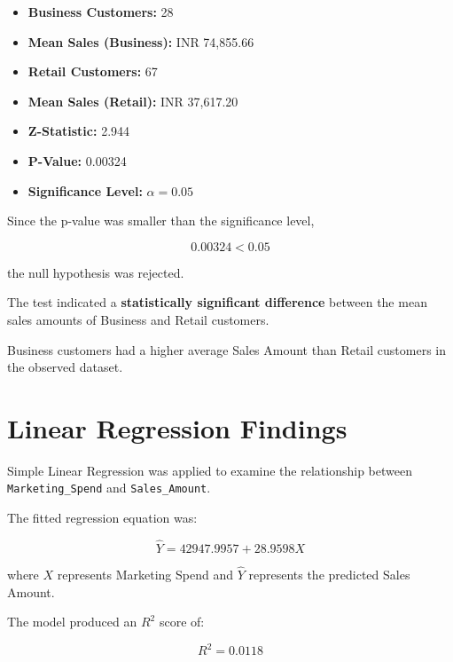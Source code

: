 \documentclass[12pt,a4paper]{report}
\begin{document}
\begin{itemize}

    \item \textbf{Business Customers:} 28

    \item \textbf{Mean Sales (Business):}
    INR 74,855.66

    \item \textbf{Retail Customers:} 67

    \item \textbf{Mean Sales (Retail):}
    INR 37,617.20

    \item \textbf{Z-Statistic:} 2.944

    \item \textbf{P-Value:} 0.00324

    \item \textbf{Significance Level:}
    $\alpha = 0.05$

\end{itemize}

Since the p-value was smaller
than the significance level,

\[
0.00324 < 0.05
\]

the null hypothesis was rejected.

The test indicated a
\textbf{statistically significant
difference} between the mean
sales amounts of Business
and Retail customers.

Business customers had a
higher average Sales Amount
than Retail customers
in the observed dataset.


\section{Linear Regression Findings}

Simple Linear Regression was
applied to examine the
relationship between
\texttt{Marketing\_Spend}
and \texttt{Sales\_Amount}.

The fitted regression equation was:

\[
\hat{Y} = 42947.9957 + 28.9598X
\]

where $X$ represents Marketing
Spend and $\hat{Y}$ represents
the predicted Sales Amount.

The model produced an
$R^2$ score of:

\[
R^2 = 0.0118
\]
\end{document}
